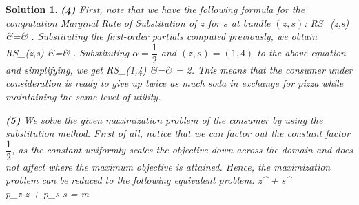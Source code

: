 \documentclass{article} %
\def\eQb#1\eQe{\begin{eqnarray*}#1\end{eqnarray*}}
\theoremstyle{quest}
\newtheorem*{solution}{Solution}
\begin{document}
\begin{solution}
\smallskip

\textbf{(4)}
First, note that we have the following formula for the 
computation Marginal Rate of Substitution of $z$ for $s$ at bundle $(z,s)$:
\eQb
MRS_{}(z,s) &=& .
\eQe
Substituting the first-order partials computed previously, we obtain
\eQb
MRS_{}(z,s) &=& .
\eQe
Substituting $\alpha = \dfrac{1}{2}$ and $(z,s) = (1,4)$ to the above equation and simplifying, we get
\eQb
MRS_{}(1,4) &=&  = 2.
\eQe
This means that the consumer under consideration is ready to give up twice as much soda 
in exchange for pizza while maintaining the same level of utility.

\pagebreak

\textbf{(5)}
We solve the given maximization problem of the consumer by using the substitution method.
First of all, notice that we can factor out the constant factor $\dfrac{1}{2}$, as the constant
uniformly scales the objective down across the domain 
and does not affect where the maximum objective is attained.
Hence, the maximization problem
can be reduced to the following equivalent problem:
\eQb
\underset{ \{ z , s \} }{\text{max}} \> z^{} + s^{} \\
 \> \text{ : } \> p_z \cdot z + p_s \cdot s = m
\eQe


\end{solution}
\end{document}
